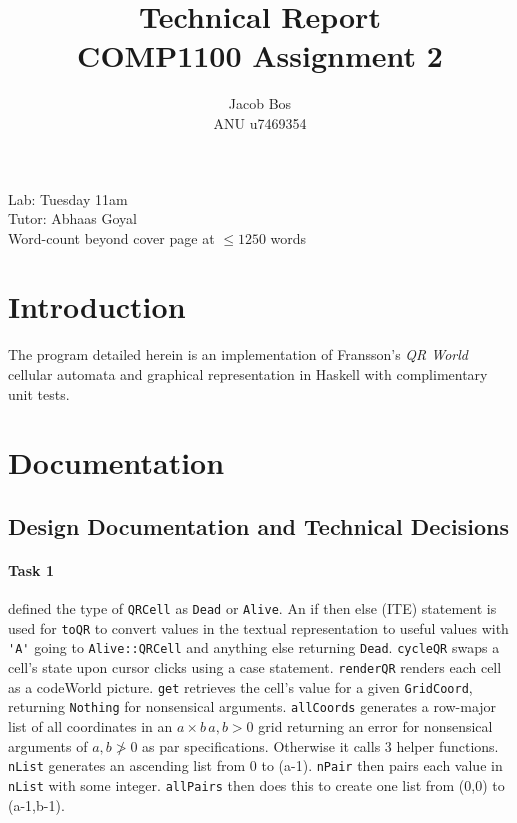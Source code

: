 \documentclass[11pt]{article}
\title{Technical Report\\ COMP1100 Assignment 2}
\author{Jacob Bos\\ ANU u7469354}
\begin{document}
\maketitle
{}
\begin{center}
  Lab: Tuesday 11am\\
  Tutor: Abhaas Goyal\\
  Word-count beyond cover page at $\leq 1250$ words
\end{center}
\tableofcontents
\newpage
{}
\section{Introduction} 
The program detailed herein is an implementation of Fransson's \textit{QR World} cellular automata and graphical representation in Haskell with complimentary unit tests.


\section{Documentation}%
\subsection{Design Documentation and Technical Decisions}
\paragraph{Task 1}  defined the type of  \verb|QRCell| as \verb|Dead| or \verb|Alive|.  An if then else (ITE) statement is used for \verb|toQR| to convert values in the textual representation to useful values with \verb|'A'| going to \verb|Alive::QRCell| and anything else returning  \verb|Dead|.  \verb|cycleQR| swaps a cell's state upon cursor clicks using a case statement.   \verb|renderQR| renders each cell as a codeWorld picture.  \verb|get| retrieves the cell's value for a given \verb|GridCoord|, returning \verb|Nothing| for nonsensical arguments. \verb|allCoords| generates a row-major list of all coordinates in an $a\times b\, a,b>0$ grid returning an error for nonsensical arguments of $a,b\not>0$ as par specifications. Otherwise it calls 3 helper functions. \verb|nList| generates an ascending list from 0 to (a-1). \verb|nPair| then pairs each value in  \verb|nList| with some integer. \verb|allPairs| then does this to create one list from (0,0) to (a-1,b-1). 
\end{document}
